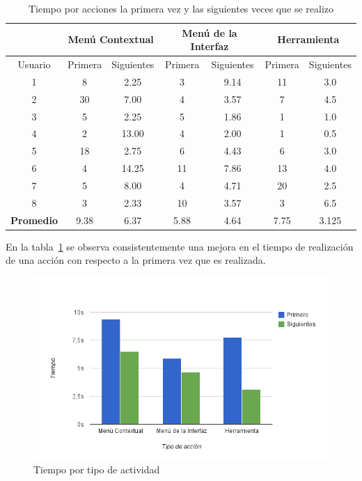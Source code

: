 \begin{table}[!hbt]
\centering
\begin{tabular}{|c|c|c|c|c|c|c|}
\hline
\rowcolor{gris} \textbf{} & \multicolumn{2}{|c|}{\textbf{Menú Contextual}} &
\multicolumn{2}{|c|}{\textbf{Menú de la Interfaz}} &
\multicolumn{2}{|c|}{\textbf{Herramienta}}\\
\hline
\rowcolor{gris} Usuario & Primera & Siguientes & Primera & Siguientes & Primera & Siguientes \\
\hline 1 &  8 &  2.25 &  3 & 9.14 & 11 & 3.0 \\
\hline 2 & 30 &  7.00 &  4 & 3.57 &  7 & 4.5 \\
\hline 3 &  5 &  2.25 &  5 & 1.86 &  1 & 1.0 \\
\hline 4 &  2 & 13.00 &  4 & 2.00 &  1 & 0.5 \\
\hline 5 & 18 &  2.75 &  6 & 4.43 &  6 & 3.0 \\
\hline 6 &  4 & 14.25 & 11 & 7.86 & 13 & 4.0 \\
\hline 7 &  5 &  8.00 &  4 & 4.71 & 20 & 2.5 \\
\hline 8 &  3 &  2.33 & 10 & 3.57 &  3 & 6.5 \\
\hline
\textbf{Promedio} & 9.38 & 6.37 & 5.88 & 4.64 & 7.75 & 3.125 \\
\end{tabular}
\caption{Tiempo por acciones la primera vez y las siguientes veces que se realizo}
\label{tab:interfaz_tiempo_acciones}
\end{table}

En la tabla~\ref{tab:interfaz_tiempo_acciones} se observa consistentemente una
mejora en el tiempo de realización de una acción con respecto a la primera vez
que es realizada. 
\begin{figure}[hbt!]
\centering
\includegraphics[width=14cm]{resultados/imagenes/interfaz_tiempo_actividades.png}
\caption{Tiempo por tipo de actividad}
\label{fig:interfaz_tiempo_acciones}
\end{figure}

